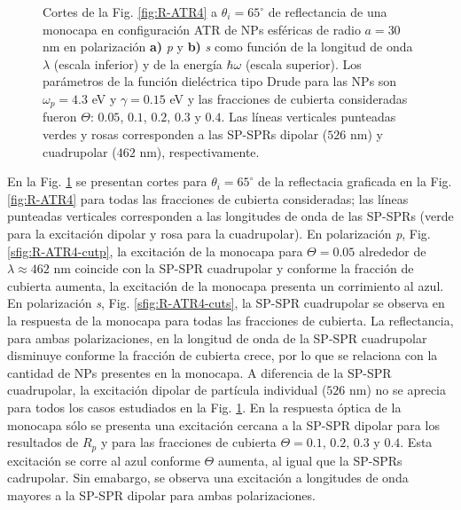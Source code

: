 \begin{figure}[b!]
	\caption{Cortes de la Fig. \ref{fig:R-ATR4} a $\theta_i = 65^\circ$ de reflectancia de una monocapa en configuración ATR de NPs esféricas de radio $a=30$ nm en polarización \textbf{a)} \emph{p} y \textbf{b)} \emph{s} como función de la longitud de onda $\lambda$ (escala inferior) y de la energía $\hbar \omega$ (escala superior). Los parámetros de la función dieléctrica tipo Drude para las NPs son $\omega_p = 4.3$ eV y $\gamma = 0.15$ eV y las fracciones de cubierta consideradas fueron $\Theta$: $0. 05$, $0. 1$, $0. 2$, $0. 3$ y $0. 4$. Las líneas verticales punteadas verdes y rosas corresponden a las SP-SPRs dipolar ($526$ nm) y cuadrupolar ($462$ nm), respectivamente. }\label{fig:R-ATR4-Cuts}
	\end{figure}	  
  
  En la Fig. \ref{fig:R-ATR4-Cuts} se presentan cortes para $\theta_i = 65^\circ$ de la reflectacia graficada en la Fig. \ref{fig:R-ATR4} para todas las fracciones de cubierta consideradas; las líneas punteadas verticales corresponden a las longitudes de onda de las SP-SPRs (verde para la excitación dipolar y rosa para la cuadrupolar). En polarización \emph{p}, Fig. \ref{sfig:R-ATR4-cutp}, la excitación de la monocapa para $\Theta=0.05$ alrededor de $\lambda \approx 462$ nm coincide con la SP-SPR cuadrupolar y conforme la fracción de cubierta aumenta, la excitación de la monocapa presenta un corrimiento al azul. En polarización \emph{s}, Fig. \ref{sfig:R-ATR4-cuts},  la SP-SPR cuadrupolar se observa en la respuesta de la monocapa para todas las fracciones de cubierta. La reflectancia, para ambas polarizaciones, en la longitud de onda de la SP-SPR cuadrupolar disminuye conforme la fracción de cubierta crece, por lo que se relaciona con la cantidad de NPs presentes en la monocapa. A diferencia de la SP-SPR cuadrupolar, la excitación dipolar de partícula individual ($526$ nm) no se aprecia para todos los casos estudiados en la Fig. \ref{fig:R-ATR4-Cuts}. En la respuesta óptica de la monocapa sólo se presenta una excitación cercana a la SP-SPR dipolar para los resultados de $R_p$ y para las fracciones de cubierta $\Theta = 0.1,\,0.2,\,0.3$ y $0.4$. Esta excitación se corre al azul conforme $\Theta$ aumenta, al igual que la SP-SPRs cadrupolar. Sin emabargo, se observa una excitación a longitudes de onda mayores a la SP-SPR dipolar para ambas polarizaciones.   
 

